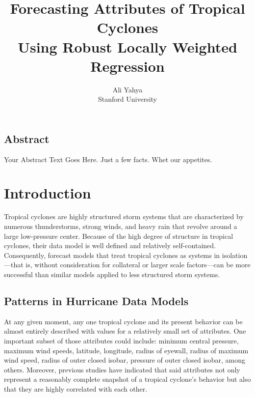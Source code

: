 \documentclass[letterpaper,twocolumn,10pt]{article}
\begin{document}
\date{}

\title{
  \Large \bf Forecasting Attributes of Tropical Cyclones\\
             Using Robust Locally Weighted Regression
}

\author {
  {\rm Ali Yahya}\\
  Stanford University
} %

\maketitle



\subsection*{Abstract}
Your Abstract Text Goes Here.  Just a few facts.
Whet our appetites.

\section{Introduction}

Tropical cyclones are highly structured storm systems that are characterized by
numerous thunderstorms, strong winds, and heavy rain that revolve around a large
low-pressure center. Because of the high degree of structure in tropical
cyclones, their data model is well defined and relatively self-contained.
Consequently, forecast models that treat tropical cyclones as systems in
isolation---that is, without consideration for collateral or larger scale
factors---can be more successful than similar models applied to less structured
storm systems.

\subsection{Patterns in Hurricane Data Models}
At any given moment, any one tropical cyclone and its present behavior can be
almost entirely described with values for a relatively small set of attributes.
One important subset of those attributes could include: minimum central
pressure, maximum wind speeds, latitude, longitude, radius of eyewall, radius of
maximum wind speed, radius of outer closed isobar, pressure of outer closed
isobar, among others. Moreover, previous studies have indicated that said
attributes not only represent a reasonably complete snapshot of a tropical
cyclone's behavior but also that they are highly correlated with each
other.~\cite{SHIPS}
\end{document}
